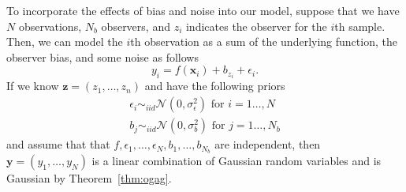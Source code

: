 To incorporate the effects of bias and noise into our model, suppose that we have $N$ observations, $N_b$ observers, and $z_i$ indicates the observer for the $i$th sample.
Then, we can model the $i$th observation as a sum of the underlying function, the observer bias, and some noise as follows
\begin{equation*}
    y_i = f(\mathbf{x}_i) + b_{z_i} + \epsilon_i.
\end{equation*}
If we know $\mathbf{z} = (z_1, \ldots, z_n)$ 
and have the following priors
\begin{align*}
    \epsilon_i \sim_{iid} \mathcal{N}(0, \sigma^2_{\epsilon}) \text{ for $i = 1 \ldots, N$}\\
    b_j \sim_{iid} \mathcal{N}(0, \sigma_{b}^2) \text{ for $j = 1 \ldots, N_b$}
\end{align*}
and assume that that $f, \epsilon_1, \ldots, \epsilon_N, b_1, \ldots, b_{N_b}$ are independent,
then $\mathbf{y} = (y_1, \ldots, y_N)$ is a linear combination of Gaussian random variables
and is Gaussian by Theorem~\ref{thm:ogag}.


